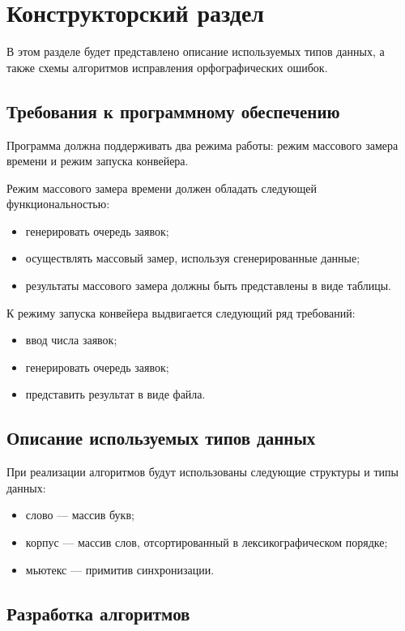 \chapter{Конструкторский раздел}

В этом разделе будет представлено описание используемых типов данных, а также схемы алгоритмов исправления орфографических ошибок.

\section{Требования к программному обеспечению}

Программа должна поддерживать два режима работы: режим массового замера времени и режим запуска конвейера.

Режим массового замера времени должен обладать следующей функциональностью:
\begin{itemize}
	\item генерировать очередь заявок;
	\item осуществлять массовый замер, используя сгенерированные данные;
	\item результаты массового замера должны быть представлены в виде таблицы.
\end{itemize}

К режиму запуска конвейера выдвигается следующий ряд требований:
\begin{itemize}
	\item ввод числа заявок;
	\item генерировать очередь заявок;
	\item представить результат в виде файла.
\end{itemize}



\section{Описание используемых типов данных}

При реализации алгоритмов будут использованы следующие структуры
и типы данных:
\begin{itemize}
	\item слово --- массив букв;
	\item корпус --- массив слов, отсортированный в лексикографическом порядке;
	\item мьютекс --- примитив синхронизации.
\end{itemize}

\section{Разработка алгоритмов}

